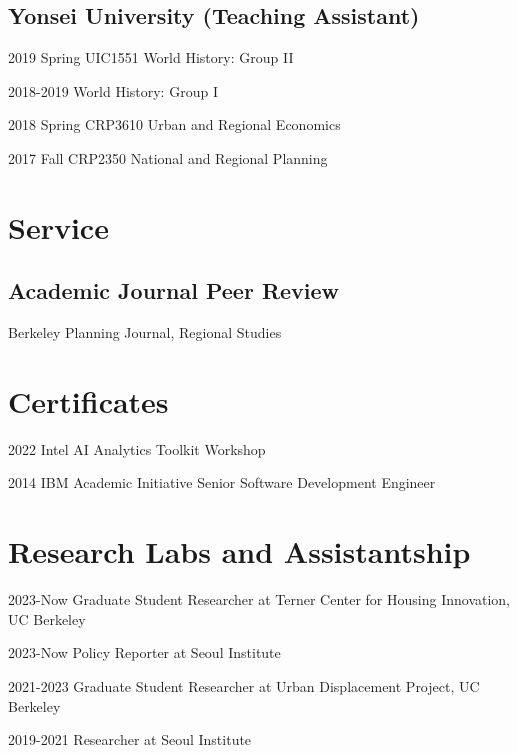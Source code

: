 \documentclass[12pt,letterpaper]{report}
\newcommand{\listitemspace}{0.25em}
\renewenvironment{itemize}
{\begin{list}{}{\setlength{\leftmargin}{0em}
                \setlength{\parskip}{0em}
                \setlength{\itemsep}{\listitemspace}
                \setlength{\parsep}{\listitemspace}}}
{\end{list}}
\begin{document}
    \subsection*{Yonsei University (Teaching Assistant)}
    \begin{tablist}
      \item[2019 Spring] \tab{}UIC1551 World History: Group II
      \item[2018-2019] \tab{}World History: Group I 
      \item[2018 Spring] \tab{}CRP3610 Urban and Regional Economics
      \item[2017 Fall] \tab{}CRP2350 National and Regional Planning
    \end{tablist}
    
  \section*{Service}
    \subsection*{Academic Journal Peer Review}
    \begin{itemize}
        \item Berkeley Planning Journal, Regional Studies
    \end{itemize}

\section*{Certificates}
    \begin{tablist}
        \item[2022] \tab{}Intel AI Analytics Toolkit Workshop
        \item[2014] \tab{}IBM Academic Initiative Senior Software Development Engineer
    \end{tablist}

    \section*{Research Labs and Assistantship}
    \begin{tablist}
        \item[2023-Now] \tab{}Graduate Student Researcher at Terner Center for Housing Innovation, UC Berkeley
        \item[2023-Now] \tab{}Policy Reporter at Seoul Institute
        \item[2021-2023] \tab{}Graduate Student Researcher at Urban Displacement Project, UC Berkeley
        \item[2019-2021] \tab{}Researcher at Seoul Institute
    \end{tablist}
\end{document}
